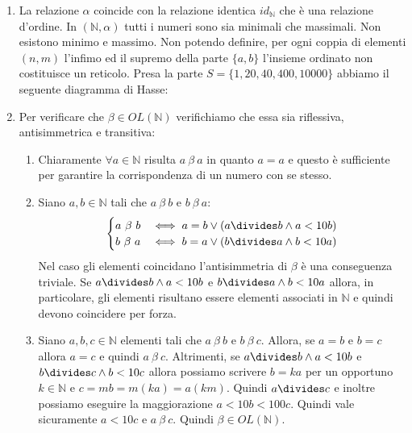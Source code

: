 \begin{enumerate}[label=(\textit{\roman*})]
	\item La relazione $\alpha$ coincide con la relazione identica $id_{\mathbb{N}}$ che è una relazione d'ordine. In $(\mathbb{N},\alpha)$ tutti i numeri sono sia minimali che massimali. Non esistono minimo e massimo. Non potendo definire, per ogni coppia di elementi $(n,m)$ l'infimo ed il supremo della parte $\{a,b\}$ l'insieme ordinato non costituisce un reticolo.
	Presa la parte $S=\{1,20,40,400,10000\}$ abbiamo il seguente diagramma di Hasse:
	\begin{center}
	\end{center}
	\item  Per verificare che $\beta \in OL(\mathbb{N})$ verifichiamo che essa sia riflessiva, antisimmetrica e transitiva:
	\begin{enumerate}
		\item Chiaramente $\forall a \in \mathbb{N}$ risulta $a \ \beta \ a $ in quanto $a=a$ e questo è sufficiente per garantire la corrispondenza di un numero con se stesso.
		\item Siano $a,b \in \mathbb{N}$ tali che $a \ \beta \ b$ e $b \ \beta \ a$:
		\begin{align}
			\begin{cases}
				a \ \beta \ b &\iff a=b \lor (a \divides b \land a < 10b) \\
				b \ \beta \ a &\iff b=a \lor (b \divides a \land b < 10a)
			\end{cases}
		\end{align}
		Nel caso gli elementi coincidano l'antisimmetria di $\beta$ è una conseguenza triviale. Se $a \divides b \land a <10b$ e $b \divides a \land b<10a$ allora, in particolare, gli elementi risultano essere elementi associati in $\mathbb{N}$ e quindi devono coincidere per forza.
		\item Siano $a,b,c \in \mathbb{N}$ elementi tali che $a \ \beta \ b$ e $b \ \beta \ c$. Allora, se $a=b$ e $b=c$ allora $a=c$ e quindi $ a \ \beta \ c$. Altrimenti, se $a \divides b \land a <10b$ e $b \divides c \land b<10c$ allora possiamo scrivere $b=ka$ per un opportuno $k \in \mathbb{N}$ e $c=mb=m(ka)=a(km)$. Quindi $a \divides c$ e inoltre possiamo eseguire la maggiorazione $a < 10b < 100c$. Quindi vale sicuramente $a < 10c$ e $a \ \beta \ c$. Quindi $\beta \in OL(\mathbb{N})$.	

\end{enumerate}
\end{enumerate}
